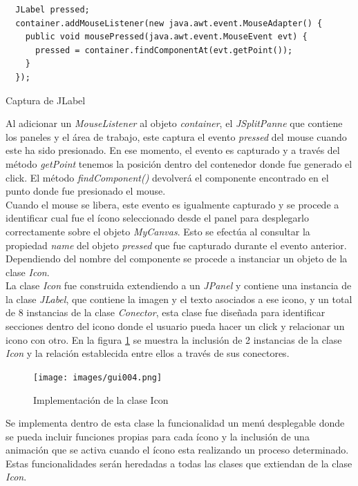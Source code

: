 \begin{codigof}[h]
\begin{verbatim}
  JLabel pressed;	
  container.addMouseListener(new java.awt.event.MouseAdapter() {
    public void mousePressed(java.awt.event.MouseEvent evt) {
      pressed = container.findComponentAt(evt.getPoint());
    }
  });
\end{verbatim}
\caption{Captura de JLabel}
\label{codgui2}
\end{codigof}

Al adicionar un \textit{MouseListener} al objeto \textit{container}, el \textit{JSplitPanne} que contiene los
paneles y el \'area de trabajo, este captura el evento \textit{pressed} del mouse cuando este ha sido presionado. 
En ese momento, el evento es capturado y a trav\'es del m\'etodo \textit{getPoint} tenemos la posici\'on dentro
del contenedor donde fue generado el click.  El m\'etodo \textit{findComponent()} devolver\'a el componente
encontrado en el punto donde fue presionado el mouse.\\

Cuando el mouse se libera, este evento es igualmente capturado y se procede a identificar cual fue el \'icono
seleccionado desde el panel para desplegarlo correctamente sobre el objeto \textit{MyCanvas}.  Esto se efect\'ua
al consultar la propiedad \textit{name} del objeto \textit{pressed} que fue capturado durante el evento anterior.
Dependiendo del nombre del componente se procede a instanciar un objeto de la clase \textit{Icon}.\\

La clase \textit{Icon} fue construida extendiendo a un \textit{JPanel} y contiene una instancia de la clase
\textit{JLabel}, que contiene la imagen y el texto asociados a ese icono, y un total de 8 instancias de la clase
\textit{Conector}, esta clase fue dise\~nada para identificar secciones dentro del icono donde el usuario pueda
hacer un click y relacionar un icono con otro.  En la figura \ref{gui004} se muestra la inclusi\'on de 2
instancias de la clase \textit{Icon} y la relaci\'on establecida entre ellos a trav\'es de sus conectores.

\begin{figure}[h]
\centering
\texttt{[image: images/gui004.png]}
\caption{Implementaci\'on de la clase Icon }
\label{gui004}
\end{figure}

Se implementa dentro de esta clase la funcionalidad un men\'u desplegable donde se pueda incluir funciones propias
para cada \'icono y la inclusi\'on de una animaci\'on que se activa cuando el \'icono esta realizando un proceso
determinado.  Estas funcionalidades ser\'an heredadas a todas las clases que extiendan de la clase \textit{Icon}.\\

